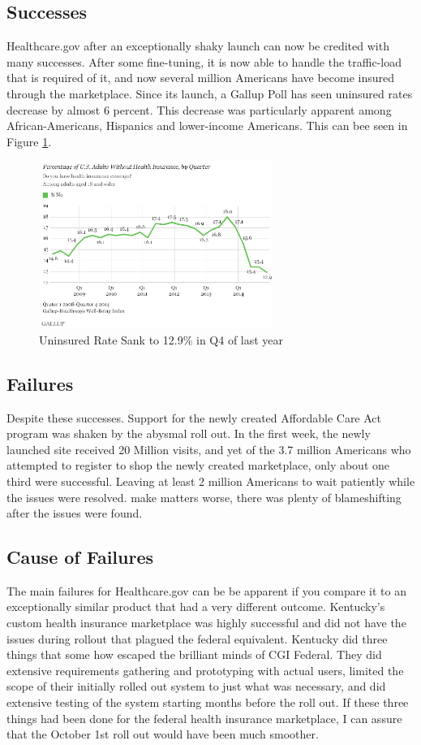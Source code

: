 \documentclass[conference]{IEEEtran}
\begin{document}
	\subsection{Successes}
	Healthcare.gov after an exceptionally shaky launch can now be credited with many successes. After some fine-tuning, it is now able to handle the traffic-load that is required of it, and now several million Americans have become insured through the marketplace. Since its launch, a Gallup Poll has seen uninsured rates decrease by almost 6 percent. This decrease was particularly apparent among African-Americans, Hispanics and lower-income Americans. This can bee seen in Figure \ref{fig:uninsured-percent}. \cite{hc_gallup} 
	\begin{figure}[h]
		\centering
			\includegraphics[width=3in]{graph-healthcare-percentage.png}
		\caption{Uninsured Rate Sank to 12.9\% in Q4 of last year}
		\label{fig:uninsured-percent}
	\end{figure}
	\subsection{Failures}
	Despite these successes. Support for the newly created Affordable Care Act program was shaken by the abysmal roll out. In the first week, the newly launched site received 20 Million visits, and yet of the 3.7 million Americans who attempted to register to shop the newly created marketplace, only about one third were successful. Leaving at least 2 million Americans to wait patiently while the issues were resolved. \cite{hc_informationweek}  make matters worse, there was plenty of blameshifting after the issues were found. 
	\subsection{Cause of Failures}
	The main failures for Healthcare.gov can be be apparent if you compare it to an exceptionally similar product that had a very different outcome. Kentucky's custom health insurance marketplace was highly successful and did not have the issues during rollout that plagued the federal equivalent. Kentucky did three things that some how escaped the brilliant minds of CGI Federal. They did extensive requirements gathering and prototyping with actual users, limited the scope of their initially rolled out system to just what was necessary, and did extensive testing of the system starting months before the roll out.\cite{hc_tpm} If these three things had been done for the federal health insurance marketplace, I can assure that the October 1st roll out would have been much smoother. \cite{hc_arstechnica}
\end{document}
